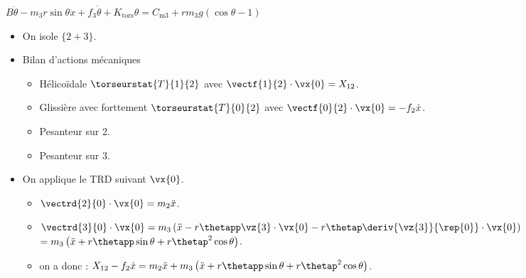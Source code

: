 \begin{corrige}
\begin{itemize}
$B\ddot{\theta} - m_3 r\sin\theta \ddot{x} + f_3 \dot{\theta} + K_{\text{tors}}\theta=  C_{\text{m3}} + rm_3g \left(\cos \theta - 1 \right) $
\end{itemize}
\end{corrige}
\else
\fi

 

\ifprof
\else
\fi

\ifprof
\begin{corrige}
\begin{itemize}
\item On isole $\{2+3\}$.
\item Bilan d'actions mécaniques 
\begin{itemize}
\item Hélicoïdale $ \torseurstat{T}{1}{2}$ avec $\vectf{1}{2}\cdot \vx{0}=X_{12}$.
\item Glissière avec forttement $ \torseurstat{T}{0}{2}$ avec $\vectf{0}{2}\cdot \vx{0}=-f_2\dot{x}$.
\item Pesanteur sur 2.
\item Pesanteur sur 3.
\end{itemize}
\item On applique le TRD suivant $\vx{0}$.
\begin{itemize}
\item $\vectrd{2}{0} \cdot \vx{0} = m_2 \ddot{x}$.
\item $\vectrd{3}{0} \cdot \vx{0} = m_3\left( \ddot{x} -r  \thetapp \vz{3}\cdot \vx{0}  -r \thetap \deriv{\vz{3}}{\rep{0}} \cdot \vx{0} \right)$ $= m_3\left( \ddot{x} +r  \thetapp \sin \theta  +r \thetap^2 \cos \theta \right)$.
\item on a donc : $X_{12}-f_2\dot{x} = m_2 \ddot{x}+ m_3\left( \ddot{x} +r  \thetapp \sin \theta  +r \thetap^2 \cos \theta \right)$.
\end{itemize}
\end{itemize}
\end{corrige}
\else
\fi


